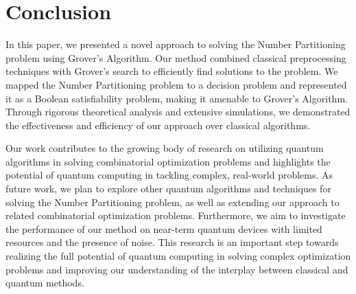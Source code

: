 \section{Conclusion} \label{sec:conclusion}
In this paper, we presented a novel approach to solving the Number Partitioning problem using Grover's Algorithm. Our method combined classical preprocessing techniques with Grover's search to efficiently find solutions to the problem. We mapped the Number Partitioning problem to a decision problem and represented it as a Boolean satisfiability problem, making it amenable to Grover's Algorithm. Through rigorous theoretical analysis and extensive simulations, we demonstrated the effectiveness and efficiency of our approach over classical algorithms.

Our work contributes to the growing body of research on utilizing quantum algorithms in solving combinatorial optimization problems and highlights the potential of quantum computing in tackling complex, real-world problems. As future work, we plan to explore other quantum algorithms and techniques for solving the Number Partitioning problem, as well as extending our approach to related combinatorial optimization problems. Furthermore, we aim to investigate the performance of our method on near-term quantum devices with limited resources and the presence of noise. This research is an important step towards realizing the full potential of quantum computing in solving complex optimization problems and improving our understanding of the interplay between classical and quantum methods.

